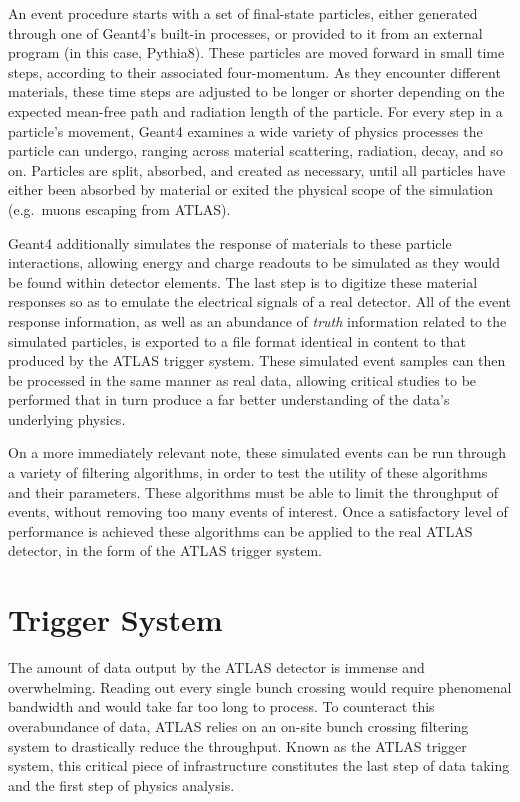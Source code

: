     An event procedure starts with a set of final-state particles,
        either generated through one of Geant4's built-in processes,
        or provided to it from an external program (in this case, Pythia8).
    These particles are moved forward in small time steps, according to their associated four-momentum.
    As they encounter different materials,
        these time steps are adjusted to be longer or shorter depending on
        the expected mean-free path and radiation length of the particle.
    For every step in a particle's movement,
        Geant4 examines a wide variety of physics processes the particle can undergo,
        ranging across material scattering, radiation, decay, and so on.
    Particles are split, absorbed, and created as necessary,
        until all particles have either been absorbed by material
        or exited the physical scope of the simulation (e.g.\ muons escaping from ATLAS).

    Geant4 additionally simulates the response of materials to these particle interactions,
        allowing energy and charge readouts to be simulated as they would be found within detector elements.
    The last step is to digitize these material responses so as to emulate the electrical signals of a real detector.
    All of the event response information, as well as an abundance of \textit{truth} information related to the simulated particles,
        is exported to a file format identical in content to that produced by the ATLAS trigger system.
    These simulated event samples can then be processed in the same manner as real data,
        allowing critical studies to be performed that in turn produce
        a far better understanding of the data's underlying physics.

    On a more immediately relevant note, these simulated events can be run through a variety of filtering algorithms,
        in order to test the utility of these algorithms and their parameters.
    These algorithms must be able to limit the throughput of events,
        without removing too many events of interest.
    Once a satisfactory level of performance is achieved these algorithms can be applied to the real ATLAS detector,
        in the form of the ATLAS trigger system.


\section{Trigger System} \label{sec:trigger}

    The amount of data output by the ATLAS detector is immense and overwhelming.
    Reading out every single bunch crossing would require phenomenal bandwidth and would take far too long to process.
    To counteract this overabundance of data, ATLAS relies on an on-site bunch crossing filtering system to drastically reduce the throughput.
    Known as the ATLAS trigger system, this critical piece of infrastructure constitutes the last step of data taking
        and the first step of physics analysis.

